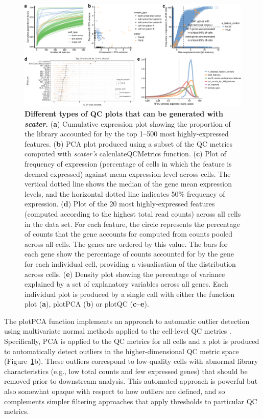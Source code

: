 \documentclass[10pt,letterpaper]{article}
\begin{document}
\begin{figure}[tpb]%
\begin{adjustwidth}{-2in}{0in}
\begin{flushright}
\includegraphics[width=1.3\textwidth]{figure3_alt}
\end{flushright}
\justify
\color{Gray}
\caption{\small \textbf{Different types of QC plots that can be generated with \emph{scater}.} (\textbf{a}) Cumulative expression plot showing the proportion of the library accounted for by the top 1--500 most highly-expressed features. (\textbf{b}) PCA plot produced using a subset of the QC metrics computed with \emph{scater's} calculateQCMetrics function. (\textbf{c}) Plot of frequency of expression (percentage of cells in which the feature is deemed expressed) against mean expression level across cells. The vertical dotted line shows the median of the gene mean expression levels, and the horizontal dotted line indicates 50\% frequency of expression. (\textbf{d}) Plot of the 20 most highly-expressed features (computed according to the highest total read counts) across all cells in the data set. For each feature, the circle represents the percentage of counts that the gene accounts for computed from counts pooled across all cells. The genes are ordered by this value. The bars for each gene show the percentage of counts accounted for by the gene for each individual cell, providing a visualisation of the distribution across cells. (\textbf{e}) Density plot showing the percentage of variance explained by a set of explanatory variables across all genes. Each individual plot is produced by a single call with either the function plot (\textbf{a}), plotPCA (\textbf{b}) or plotQC (\textbf{c--e}).}\label{fig:03}
\end{adjustwidth}
\end{figure}

The plotPCA function implements an approach to automatic outlier
detection using multivariate normal methods applied to the cell-level QC
metrics \citep{Ilicic2016-dm}. Specifically, PCA is applied to the QC metrics
for all cells and a plot is produced to automatically detect outliers in the
higher-dimensional QC metric space (Figure~\ref{fig:03}b). These outliers
correspond to low-quality cells with abnormal library characteristics (e.g.,
low total counts and few expressed genes) that should be removed prior to
downstream analysis. This automated approach is powerful but also somewhat opaque with respect to how outliers are defined, and so complements simpler filtering approaches that apply thresholds to particular QC metrics.
\end{document}
